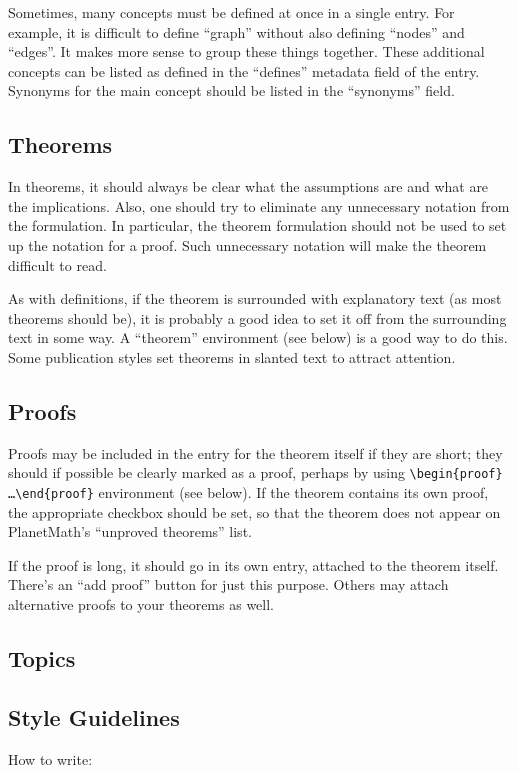 Sometimes, many concepts must be defined at once in a single entry. For example, it is difficult to define ``graph'' without also defining ``nodes'' and ``edges''. It makes more sense to group these things together. These additional concepts can be listed as defined in the ``defines'' metadata field of the entry. Synonyms for the main concept should be listed in the ``synonyms'' field.


\subsection{Theorems}
In theorems, it should always be clear what the assumptions
are and what are the implications. Also, one should try to eliminate
any unnecessary notation from the formulation. In particular, the
theorem formulation should not be used to set up the notation for
a proof. Such unnecessary notation will make the theorem difficult
to read.

As with definitions, if the theorem is surrounded with explanatory text (as most theorems should be), it is probably a good idea to set it off from the surrounding text in some way. A ``theorem'' environment (see below) is a good way to do this. Some publication styles set theorems in slanted text to attract attention.

\subsection{Proofs}

Proofs may be included in the entry for the theorem itself if they are
short; they should if possible be clearly marked as a proof, perhaps
by using {\tt \verb|\begin{proof}| \ldots \verb|\end{proof}|}
environment (see below). If the theorem contains its own proof, the
appropriate checkbox should be set, so that the theorem does not
appear on PlanetMath's ``unproved theorems'' list.

If the proof is long, it should go in its own entry, attached to the theorem itself. There's an ``add proof'' button for just this purpose. Others may attach alternative proofs to your theorems as well.

\subsection{Topics}

\subsection*{Style Guidelines}
How to write:

